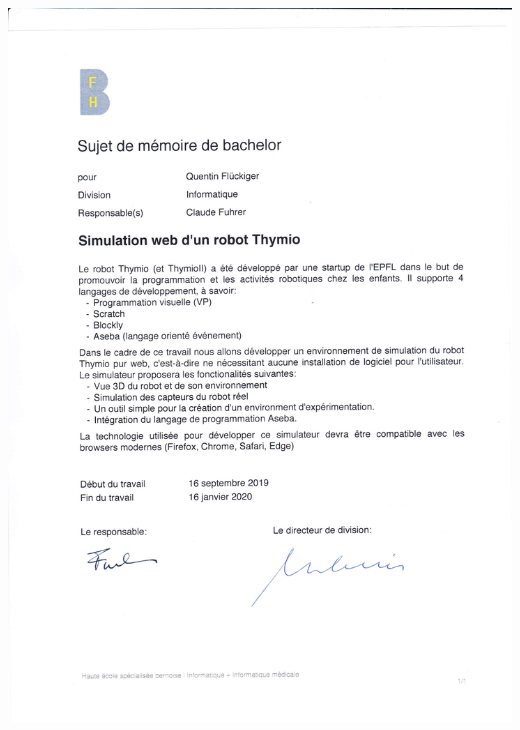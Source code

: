 \documentclass{scrbook}
\begin{document}
\thispagestyle{empty}
\includegraphics[width=\textwidth]{pdf/bachelor_quentin.pdf}

\printbibliography[heading=bibintoc]
\end{document}
